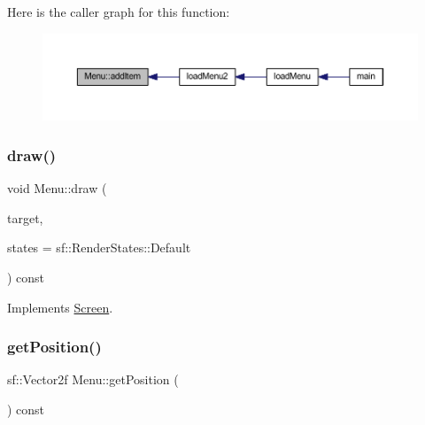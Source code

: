 Here is the caller graph for this function\+:\nopagebreak
\begin{figure}[H]
\begin{center}
\leavevmode
\includegraphics[width=350pt]{class_menu_aa8032782ee75fba5fa17bf7a20635c68_icgraph}
\end{center}
\end{figure}
\mbox{\label{class_menu_a7bc75c51f0ae43faeb694b8a0c4c7d16}} 
\subsubsection{\texorpdfstring{draw()}{draw()}}
{\footnotesize\ttfamily void Menu\+::draw (\begin{DoxyParamCaption}\item[{sf\+::\+Render\+Target \&}]{target,  }\item[{sf\+::\+Render\+States}]{states = {\ttfamily sf\+:\+:RenderStates\+:\+:Default} }\end{DoxyParamCaption}) const\hspace{0.3cm}{\ttfamily [virtual]}}



Implements \hyperlink{class_screen_abcb5544dfe717c7da181520803f43e25}{Screen}.

\mbox{\label{class_menu_a589f53bbd6436b381b5ec92a609d5d66}} 
\subsubsection{\texorpdfstring{get\+Position()}{getPosition()}}
{\footnotesize\ttfamily sf\+::\+Vector2f Menu\+::get\+Position (\begin{DoxyParamCaption}{ }\end{DoxyParamCaption}) const}

